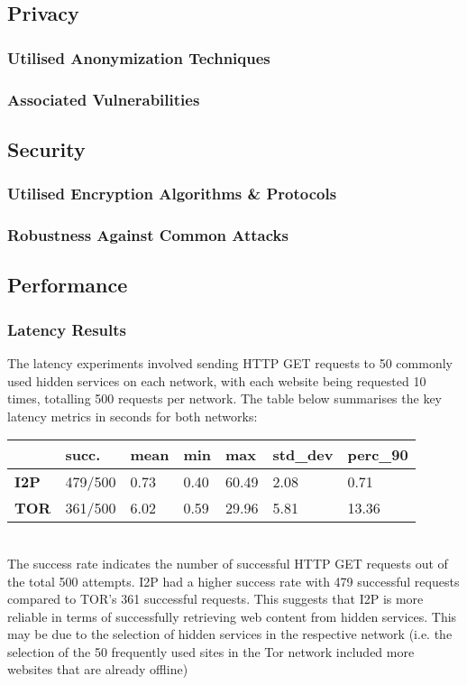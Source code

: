 \documentclass[12pt,conference]{IEEEtran}
\begin{document}
\subsection{Privacy}
\subsubsection{Utilised Anonymization Techniques}
\subsubsection{Associated Vulnerabilities}
\subsection{Security}
\subsubsection{Utilised Encryption Algorithms \& Protocols}
\subsubsection{Robustness Against Common Attacks}
\subsection{Performance}
\subsubsection{Latency Results}The latency experiments involved sending HTTP GET requests to 50 commonly used hidden services on each network, with each website being requested 10 times, totalling 500 requests per network. The table below summarises the key latency metrics in seconds for both networks:
\begin{table}[h]
\begin{tabular}{lllllll}
\textbf{}    & \textbf{succ.} & \textbf{mean} & \textbf{min} & \textbf{max} & \textbf{std\_dev} & \textbf{perc\_90} \\ \hline
\textbf{I2P} & 479/500        & 0.73          & 0.40         & 60.49        & 2.08              & 0.71              \\
\textbf{TOR} & 361/500        & 6.02          & 0.59         & 29.96        & 5.81              & 13.36            
\end{tabular}
\end{table}
\\
The success rate indicates the number of successful HTTP GET requests out of the total 500 attempts. I2P had a higher success rate with 479 successful requests compared to TOR's 361 successful requests. This suggests that I2P is more reliable in terms of successfully retrieving web content from hidden services. This may be due to the selection of hidden services in the respective network (i.e. the selection of the 50 frequently used sites in the Tor network included more websites that are already offline)
\end{document}
